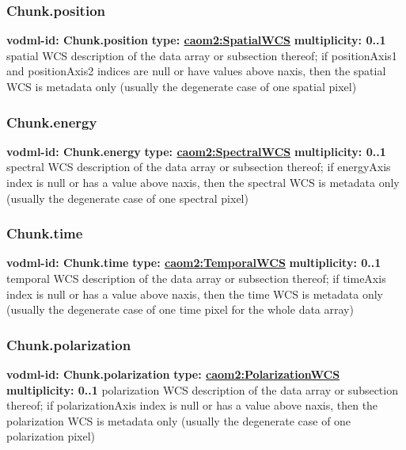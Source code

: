    \subsubsection{Chunk.position}
      \textbf{vodml-id: Chunk.position} \newline
      \textbf{type: \hyperref[sect:SpatialWCS]{caom2:SpatialWCS}} \newline
      \textbf{multiplicity: 0..1} \newline
      spatial WCS description of the data array or subsection thereof; if positionAxis1 and positionAxis2 indices are null or have values above {naxis}, then the spatial WCS is metadata only (usually the degenerate case of one spatial pixel)

    \subsubsection{Chunk.energy}
      \textbf{vodml-id: Chunk.energy} \newline
      \textbf{type: \hyperref[sect:SpectralWCS]{caom2:SpectralWCS}} \newline
      \textbf{multiplicity: 0..1} \newline
      spectral WCS description of the data array or subsection thereof; if energyAxis index is null or has a value above {naxis}, then the spectral WCS is metadata only (usually the degenerate case of one spectral pixel)

    \subsubsection{Chunk.time}
      \textbf{vodml-id: Chunk.time} \newline
      \textbf{type: \hyperref[sect:TemporalWCS]{caom2:TemporalWCS}} \newline
      \textbf{multiplicity: 0..1} \newline
      temporal WCS description of the data array or subsection thereof; if timeAxis index is null or has a value above {naxis}, then the time WCS is metadata only (usually the degenerate case of one time pixel for the whole data array)

    \subsubsection{Chunk.polarization}
      \textbf{vodml-id: Chunk.polarization} \newline
      \textbf{type: \hyperref[sect:PolarizationWCS]{caom2:PolarizationWCS}} \newline
      \textbf{multiplicity: 0..1} \newline
      polarization WCS description of the data array or subsection thereof; if polarizationAxis index is null or has a value above {naxis}, then the polarization WCS is metadata only (usually the degenerate case of one polarization pixel)


